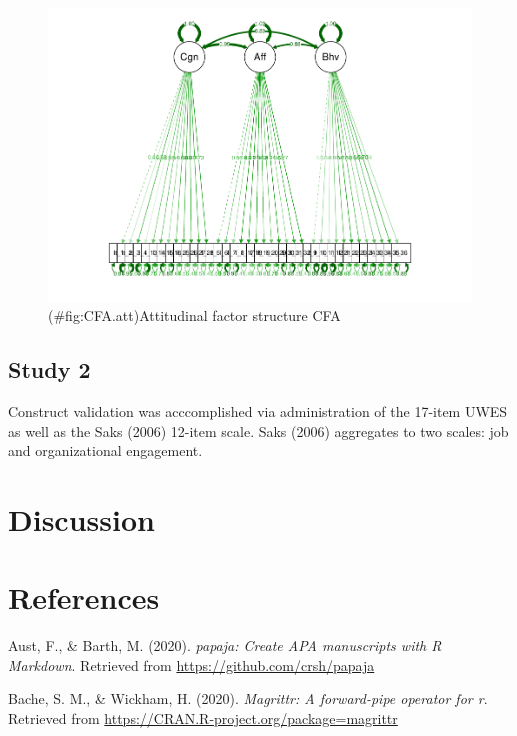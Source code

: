 \documentclass[
  english,
  man]{apa6}
\begin{document}
\begin{figure}
\centering
\includegraphics{SIOPpapaja_files/figure-latex/CFA.att-1.pdf}
\caption{(\#fig:CFA.att)Attitudinal factor structure CFA}
\end{figure}

\hypertarget{study-2}{%
\subsection{Study 2}\label{study-2}}

Construct validation was acccomplished via administration of the 17-item UWES as well as the Saks (2006) 12-item scale. Saks (2006) aggregates to two scales: job and organizational engagement.

\hypertarget{discussion}{%
\section{Discussion}\label{discussion}}

\newpage

\hypertarget{references}{%
\section{References}\label{references}}

\begingroup
\setlength{\parindent}{-0.5in}
\setlength{\leftskip}{0.5in}

\hypertarget{refs}{}
\leavevmode\hypertarget{ref-R-papaja}{}%
Aust, F., \& Barth, M. (2020). \emph{papaja: Create APA manuscripts with R Markdown}. Retrieved from \url{https://github.com/crsh/papaja}

\leavevmode\hypertarget{ref-R-magrittr}{}%
Bache, S. M., \& Wickham, H. (2020). \emph{Magrittr: A forward-pipe operator for r}. Retrieved from \url{https://CRAN.R-project.org/package=magrittr}
\end{document}
